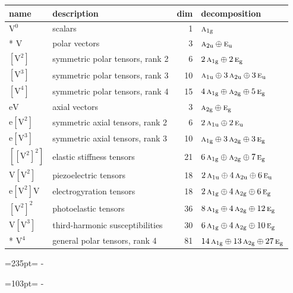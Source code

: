 \documentclass[10pt,a4paper]{article}
\newcommand{\needspace}[1]{\par\penalty-100\begingroup\dimen0=#1\relax\dimen2=\pagegoal
  \advance\dimen2-\pagetotal\ifdim\dimen0>\dimen2\relax\ifdim\dimen2>0pt\vfil\break\fi\fi
  \endgroup}
\numberwithin{equation}{section}
\newcommand{\irr}[1]{\text{\normalfont\scshape #1}}
\newcommand{\ptag}[1]{\mathrm{#1}}
\newcommand{\jahn}[1]{\mathrm{#1}}
\newlength{\fillwidth}\newlength{\cellwidth}\newlength{\colwidth}
\begin{document}
{\begin{longtable}{@{}llr>{\RaggedRight\arraybackslash}p{\fillwidth}@{}}
name & description & dim & decomposition\\\midrule\endhead
\bottomrule\endfoot\endlastfoot
$\jahn{V^{0}}$ & scalars & 1 & $\irr{a}_{1\ptag{g}}$\\*
$\jahn{V}$ & polar vectors & 3 & $\irr{a}_{2\ptag{u}} \oplus\allowbreak \irr{e}_{\ptag{u}}$\\
$\jahn{[V^{2}]}$ & symmetric polar tensors, rank 2 & 6 & $2\,\irr{a}_{1\ptag{g}} \oplus\allowbreak 2\,\irr{e}_{\ptag{g}}$\\
$\jahn{[V^{3}]}$ & symmetric polar tensors, rank 3 & 10 & $\irr{a}_{1\ptag{u}} \oplus\allowbreak 3\,\irr{a}_{2\ptag{u}} \oplus\allowbreak 3\,\irr{e}_{\ptag{u}}$\\
$\jahn{[V^{4}]}$ & symmetric polar tensors, rank 4 & 15 & $4\,\irr{a}_{1\ptag{g}} \oplus\allowbreak \irr{a}_{2\ptag{g}} \oplus\allowbreak 5\,\irr{e}_{\ptag{g}}$\\
$\jahn{eV}$ & axial vectors & 3 & $\irr{a}_{2\ptag{g}} \oplus\allowbreak \irr{e}_{\ptag{g}}$\\
$\jahn{e[V^{2}]}$ & symmetric axial tensors, rank 2 & 6 & $2\,\irr{a}_{1\ptag{u}} \oplus\allowbreak 2\,\irr{e}_{\ptag{u}}$\\
$\jahn{e[V^{3}]}$ & symmetric axial tensors, rank 3 & 10 & $\irr{a}_{1\ptag{g}} \oplus\allowbreak 3\,\irr{a}_{2\ptag{g}} \oplus\allowbreak 3\,\irr{e}_{\ptag{g}}$\\
$\jahn{[[V^{2}]^{2}]}$ & elastic stiffness tensors & 21 & $6\,\irr{a}_{1\ptag{g}} \oplus\allowbreak \irr{a}_{2\ptag{g}} \oplus\allowbreak 7\,\irr{e}_{\ptag{g}}$\\
$\jahn{V[V^{2}]}$ & piezoelectric tensors & 18 & $2\,\irr{a}_{1\ptag{u}} \oplus\allowbreak 4\,\irr{a}_{2\ptag{u}} \oplus\allowbreak 6\,\irr{e}_{\ptag{u}}$\\
$\jahn{e[V^{2}]V}$ & electrogyration tensors & 18 & $2\,\irr{a}_{1\ptag{g}} \oplus\allowbreak 4\,\irr{a}_{2\ptag{g}} \oplus\allowbreak 6\,\irr{e}_{\ptag{g}}$\\
$\jahn{[V^{2}]^{2}}$ & photoelastic tensors & 36 & $8\,\irr{a}_{1\ptag{g}} \oplus\allowbreak 4\,\irr{a}_{2\ptag{g}} \oplus\allowbreak 12\,\irr{e}_{\ptag{g}}$\\
$\jahn{V[V^{3}]}$ & third-harmonic susceptibilities & 30 & $6\,\irr{a}_{1\ptag{g}} \oplus\allowbreak 4\,\irr{a}_{2\ptag{g}} \oplus\allowbreak 10\,\irr{e}_{\ptag{g}}$\\*
$\jahn{V^{4}}$ & general polar tensors, rank 4 & 81 & $14\,\irr{a}_{1\ptag{g}} \oplus\allowbreak 13\,\irr{a}_{2\ptag{g}} \oplus\allowbreak 27\,\irr{e}_{\ptag{g}}$\\
\bottomrule\end{longtable}}
\needspace{235pt}
\needspace{103pt}
\end{document}
